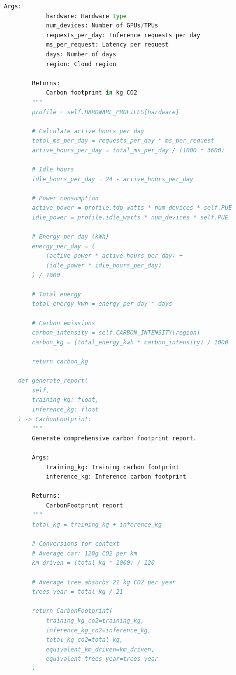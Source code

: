 \begin{lstlisting}[language=Python, caption=ML Carbon Footprint Calculator]
        Args:
            hardware: Hardware type
            num_devices: Number of GPUs/TPUs
            requests_per_day: Inference requests per day
            ms_per_request: Latency per request
            days: Number of days
            region: Cloud region

        Returns:
            Carbon footprint in kg CO2
        """
        profile = self.HARDWARE_PROFILES[hardware]

        # Calculate active hours per day
        total_ms_per_day = requests_per_day * ms_per_request
        active_hours_per_day = total_ms_per_day / (1000 * 3600)

        # Idle hours
        idle_hours_per_day = 24 - active_hours_per_day

        # Power consumption
        active_power = profile.tdp_watts * num_devices * self.PUE
        idle_power = profile.idle_watts * num_devices * self.PUE

        # Energy per day (kWh)
        energy_per_day = (
            (active_power * active_hours_per_day) +
            (idle_power * idle_hours_per_day)
        ) / 1000

        # Total energy
        total_energy_kwh = energy_per_day * days

        # Carbon emissions
        carbon_intensity = self.CARBON_INTENSITY[region]
        carbon_kg = (total_energy_kwh * carbon_intensity) / 1000

        return carbon_kg

    def generate_report(
        self,
        training_kg: float,
        inference_kg: float
    ) -> CarbonFootprint:
        """
        Generate comprehensive carbon footprint report.

        Args:
            training_kg: Training carbon footprint
            inference_kg: Inference carbon footprint

        Returns:
            CarbonFootprint report
        """
        total_kg = training_kg + inference_kg

        # Conversions for context
        # Average car: 120g CO2 per km
        km_driven = (total_kg * 1000) / 120

        # Average tree absorbs 21 kg CO2 per year
        trees_year = total_kg / 21

        return CarbonFootprint(
            training_kg_co2=training_kg,
            inference_kg_co2=inference_kg,
            total_kg_co2=total_kg,
            equivalent_km_driven=km_driven,
            equivalent_trees_year=trees_year
        )


\end{lstlisting}
